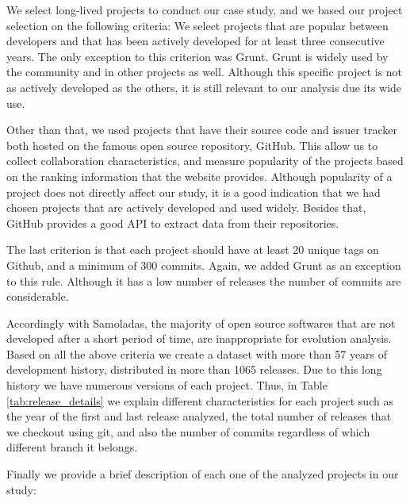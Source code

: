 We select long-lived projects to conduct our case study, and we based our project selection on the following criteria: We select projects that are popular between developers and that has been actively developed for at least three consecutive years. The only exception to this criterion was Grunt. Grunt is widely used by the community and in other projects as well. Although this specific project is not as actively developed as the others, it is still relevant to our analysis due its wide use.

Other than that, we used projects that have their source code and issuer tracker both hosted on the famous open source repository, GitHub. This allow us to collect collaboration characteristics, and measure popularity of the projects based on the ranking information that the website provides. Although popularity of a project does not directly affect our study, it is a good indication that we had chosen projects that are actively developed and used widely. Besides that, GitHub provides a good API to extract data from their repositories.

The last criterion is that each project should have at least 20 unique tags on Github, and a minimum of 300 commits. Again, we added Grunt as an exception to this rule. Although it has a low number of releases the number of commits are considerable.

Accordingly with Samoladas\cite{Samoladas2010SAD}, the majority of open source softwares that are not developed after a short period of time, are inappropriate for evolution analysis. Based on all the above criteria we create a dataset with more than 57 years of development history, distributed in more than 1065 releases. Due to this long history we have numerous versions of each project. Thus, in Table \ref{tab:release_details} we explain different characteristics for each project such as the year of the first and last release analyzed, the total number of releases that we checkout using git, and also the number of commits regardless of which different branch it belongs. 

Finally we provide a brief description of each one of the analyzed projects in our study:

